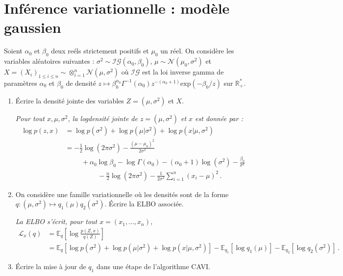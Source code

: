 \documentclass[a4paper,10pt,fleqn]{article}
\newcommand{\1}{\ensuremath{\mathbbm{1}}}
\begin{document}
\section{Inf\'erence variationnelle : mod\`ele gaussien}
Soient $\alpha_0$ et $\beta_0$ deux re\'els strictement positifs et $\mu_0$ un r\'eel. On consid\`ere les variables al\'eatoires suivantes : $\sigma^2 \sim\mathcal{IG}(\alpha_0,\beta_0)$, $\mu\sim\mathcal{N}(\mu_0,\sigma^2)$ et $X = (X_i)_{1\leq i\leq n}\sim\otimes_{i=1}^n\mathcal{N}(\mu,\sigma^2)$ o\`u $\mathcal{IG}$ est la loi inverse gamma de param\`etres $\alpha_0$ et $\beta_0$ de densit\'e $z\mapsto \beta_0^{\alpha_0}\Gamma^{-1}(\alpha_0)z^{-(\alpha_0+1)}\mathrm{exp}(-\beta_0/z)$ sur $\mathbb{R}_+^*$.
\begin{enumerate}
\item \'Ecrire la densit\'e jointe des variables $Z=(\mu,\sigma^2)$ et $X$.

\vspace{.2cm}

{\em
Pour tout $x,\mu,\sigma^2$, la logdensit\'e jointe de $z=(\mu,\sigma^2)$ et $x$ est donn\'ee par :
\begin{align*}
\log p (z,x) &= \log p(\sigma^2) + \log p(\mu|\sigma^2) + \log p(x|\mu,\sigma^2)\\
&= -\frac{1}{2}\log(2\pi \sigma^2) - \frac{(\mu-\mu_0)^2}{2\sigma^2} \\
&\hspace{1cm} + \alpha_0\log \beta_0 - \log \Gamma(\alpha_0) - (\alpha_0+1)\log(\sigma^{2}) - \frac{\beta_0}{\sigma^2}\\
&\hspace{2cm} -\frac{n}{2}\log(2\pi \sigma^2) - \frac{1}{2\sigma^2}\sum_{i=1}^n(x_i-\mu)^2\,.
\end{align*}
}

\item On consid\`ere une famille variationnelle o\`u les densit\'es sont de la forme $q:(\mu,\sigma^2)\mapsto q_1(\mu)q_{2}(\sigma^2)$. \'Ecrire la ELBO associ\'ee.

\vspace{.2cm}

{\em
La ELBO s'\'ecrit, pour tout $x = (x_1,\ldots,x_n)$,
\begin{align*}
\mathcal{L}_x(q) &= \mathbb{E}_q\left[\log\frac{p(Z,x)}{q(Z)}\right]\\
&= \mathbb{E}_q\left[\log p(\sigma^2) + \log p(\mu|\sigma^2) + \log p(x|\mu,\sigma^2)\right] - \mathbb{E}_{q_1}\left[\log q_{1}(\mu)\right] - \mathbb{E}_{q_{2}}\left[\log q_{2}(\sigma^2)\right]\,.
\end{align*}
}
\item \'Ecrire la mise \`a jour de $q_1$ dans une \'etape de l'algorithme CAVI. 


\end{enumerate}
\end{document}
